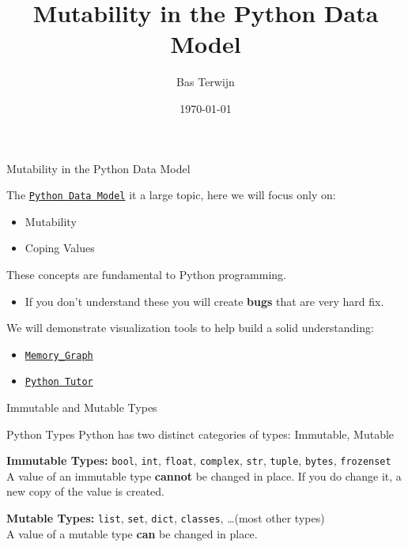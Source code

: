 \documentclass[10pt, colorlinks=true, urlcolor=blue]{beamer}
\title{Mutability in the Python Data Model}
\author{Bas Terwijn}
\date{\today}
\begin{document}
\begin{frame}
    \titlepage
\end{frame}

\begin{frame}{Mutability in the Python Data Model}

  The \href{https://docs.python.org/3/reference/datamodel.html}{\texttt{Python Data Model}} it a large topic, here we will focus only on:
  \begin{itemize}
  \item Mutability
  \item Coping Values
  \end{itemize}

  \vspace{2em}
  
  These concepts are fundamental to Python programming.
  \begin{itemize}
    \item If you don't understand these you will create \textbf{bugs} that are very hard fix.
  \end{itemize}

  \vspace{2em}
  
  We will demonstrate visualization tools to help build a solid understanding:
  \begin{itemize}
  \item \href{https://pypi.org/project/memory-graph/}{\texttt{Memory\_Graph}}
  \item \href{https://pythontutor.com/}{\texttt{Python Tutor}}
  \end{itemize}
\end{frame}


\begin{frame}{Immutable and Mutable Types}
    \begin{block}{Python Types}
        Python has two distinct categories of types: Immutable, Mutable
    \end{block}

    \vspace{3em}
    
    \textbf{Immutable Types:} \texttt{bool}, \texttt{int}, \texttt{float}, \texttt{complex}, \texttt{str}, \texttt{tuple}, \texttt{bytes}, \texttt{frozenset} \\
    \vspace{0.5em}
    A value of an immutable type \textbf{cannot} be changed in place. If you do change it, a new copy of the value is created. \\
    
    \vspace{3em}
    
    \textbf{Mutable Types:} \texttt{list}, \texttt{set}, \texttt{dict}, \texttt{classes}, \dots (most other types) \\
    \vspace{0.5em}
    A value of a mutable type \textbf{can} be changed in place.
    
\end{frame}
\end{document}
